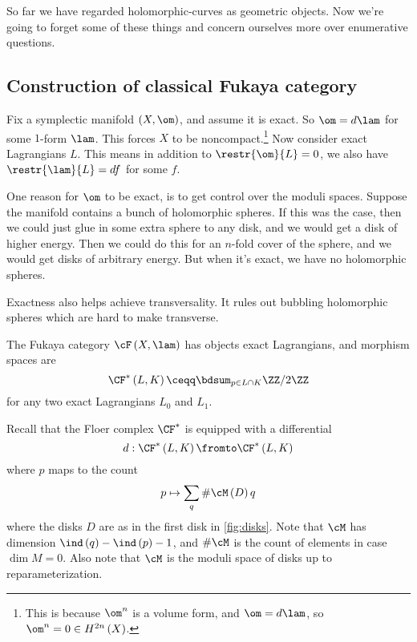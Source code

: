 \documentclass{amsart}
\begin{document}
So far we have regarded holomorphic-curves as geometric objects. 
Now we're going to forget some of these things and concern ourselves more over
enumerative questions. 

\subsection{Construction of classical Fukaya category}

Fix a symplectic manifold $\left( X , \om \right)$, and assume it is exact.
So $\om = d\lam$ for some $1$-form $\lam$. 
This forces $X$ to be noncompact.\footnote{
This is because $\om^n$ is a volume form, and $\om = d\lam$,
so $\om^n = 0\in H^{2n}\left( X \right)$.}
Now consider exact Lagrangians $L$.
This means in addition to $\restr{\om}{L}= 0$,
we also have $\restr{\lam}{L} = df$ for some $f$.

\begin{rmk}
One reason for $\om$ to be exact, is to get control over the moduli spaces.
Suppose the manifold contains a bunch of holomorphic spheres.
If this was the case, then we could just glue in some extra sphere to any disk, and we would get
a disk of higher energy.
Then we could do this for an $n$-fold cover of the sphere, and we would get disks of arbitrary
energy.
But when it's exact, we have no holomorphic spheres.

Exactness also helps achieve transversality.
It rules out bubbling holomorphic spheres which are hard to make transverse.
\end{rmk}

\begin{defn}
The Fukaya category $\cF\left( X , \lam \right)$ has objects exact
Lagrangians, and morphism spaces are 
\begin{equation}
\CF^*\left( L , K \right) \ceqq
\bdsum_{p\in L\cap K} \ZZ / 2\ZZ
\end{equation}
for any two exact Lagrangians $L_0$ and $L_1$.
\end{defn}

Recall that the Floer complex $\CF^*$ is equipped with a differential
\begin{equation}
d: \CF^*\left( L , K \right) \fromto \CF^*\left( L , K \right)
\end{equation}
where $p$ maps to the count
\begin{equation}
p\mapsto
\sum_q \# \cM\left( D \right) q
\end{equation}
where the disks $D$ are as in the first disk in \cref{fig:disks}.
Note that $\cM$ has dimension $\ind\left( q \right) - \ind\left( p \right) - 1$, 
and $\# \cM$ is the count of elements in case $\dim M = 0$.
Also note that $\cM$ is the moduli space of disks up to reparameterization.
\end{document}
